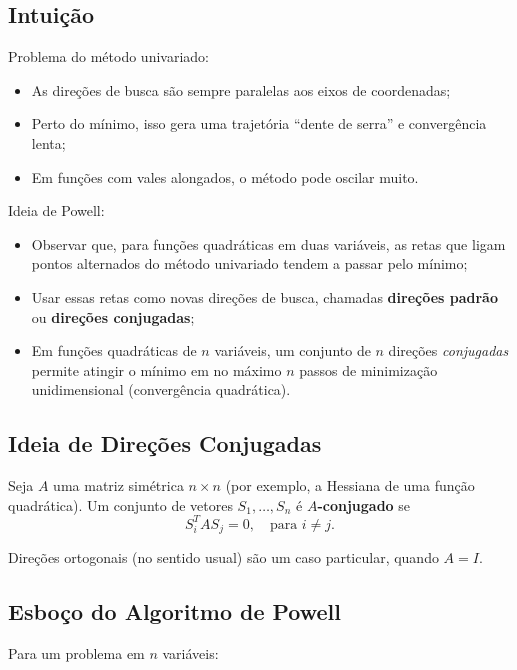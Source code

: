 \documentclass[9pt,a4paper]{extarticle}
\begin{document}
\subsection{Intuição}

Problema do método univariado:
\begin{itemize}
    \item As direções de busca são sempre paralelas aos eixos de coordenadas;
    \item Perto do mínimo, isso gera uma trajetória “dente de serra” e convergência lenta;
    \item Em funções com vales alongados, o método pode oscilar muito.
\end{itemize}

Ideia de Powell:
\begin{itemize}
    \item Observar que, para funções quadráticas em duas variáveis, as retas que ligam pontos alternados do método univariado tendem a passar pelo mínimo;
    \item Usar essas retas como novas direções de busca, chamadas \textbf{direções padrão} ou \textbf{direções conjugadas};
    \item Em funções quadráticas de $n$ variáveis, um conjunto de $n$ direções \emph{conjugadas} permite atingir o mínimo em no máximo $n$ passos de minimização unidimensional (convergência quadrática).
\end{itemize}

\subsection{Ideia de Direções Conjugadas}

Seja $A$ uma matriz simétrica $n \times n$ (por exemplo, a Hessiana de uma função quadrática). Um conjunto de vetores $S_1,\dots,S_n$ é \textbf{$A$-conjugado} se
\[
    S_i^T A S_j = 0,\quad \text{para } i \neq j.
\]

Direções ortogonais (no sentido usual) são um caso particular, quando $A = I$.

\subsection{Esboço do Algoritmo de Powell}

Para um problema em $n$ variáveis:
\end{document}
